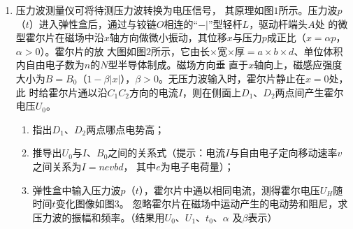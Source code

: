 \begin{enumerate}
\item 
{}
压力波测量仪可将待测压力波转换为电压信号，
其原理如图$ 1 $所示。压力波$ p $（$ t $）进入弹性盒后，通过与铰链$ O $相连的“$ -| $”型轻杆$ L $，驱动杆端头$ A $处
的微型霍尔片在磁场中沿$ x $轴方向做微小振动，其位移$ x $与压力$ p $成正比（$ x= \alpha p $，$ \alpha >0 $）。霍尔片的放
大图如图$ 2 $所示，它由长$ \times $宽$ \times $厚$ =a \times b \times d $、单位体积内自由电子数为$ n $的$ N $型半导体制成。磁场方向垂
直于$ x $轴向上，磁感应强度大小为$ B=B_{0} $（$ 1- \beta |x| $），$ \beta >0 $。无压力波输入时，霍尔片静止在$ x=0 $处，此
时给霍尔片通以沿$ C_{1} C_{2} $方向的电流$ I $，则在侧面上$ D_{1} $、$ D_{2} $两点间产生霍尔电压$ U_{0} $。
\begin{enumerate}
	\item
指出$ D_{1} $、$ D_{2} $两点哪点电势高；


\item 
推导出$ U_{0} $与$ I $、$ B_{0} $之间的关系式（提示：电流$ I $与自由电子定向移动速率$ v $之间关系为$ I=nevbd $，
其中$ e $为电子电荷量）；

\item 
弹性盒中输入压力波$ p $（$ t $），霍尔片中通以相同电流，测得霍尔电压$ U_{H} $随时间$ t $变化图像如图$ 3 $。
忽略霍尔片在磁场中运动产生的电动势和阻尼，求压力波的振幅和频率。（结果用$ U_{0} $、$ U_{1} $、$ t_{0} $、$ \alpha $
及$ \beta $表示）

\end{enumerate}
\begin{figure}[h!]
	\centering
\begin{subfigure}{0.4\linewidth}
	\centering
	 
	\caption{}\label{}
\end{subfigure}
\begin{subfigure}{0.4\linewidth}
	\centering
	 
	\caption{}\label{}
\end{subfigure}
\end{figure}






\end{enumerate}
